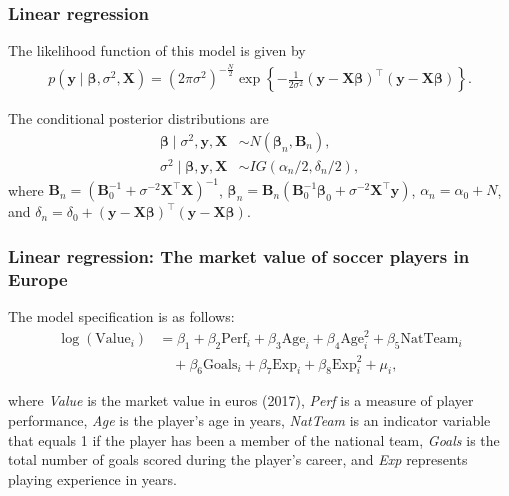 \documentclass[12pt, compress]{beamer}
\begin{document}
\begin{frame}
	\frametitle{Linear regression}
The likelihood function of this model is given by
\begin{align*}
	p({\bm{y}} \mid \bm{\beta}, \sigma^2, {\bm{X}}) 
	= (2\pi\sigma^2)^{-\frac{N}{2}} 
	\exp\left\{ -\frac{1}{2\sigma^2} ({\bm{y}} - {\bm{X}}\bm{\beta})^{\top} ({\bm{y}} - {\bm{X}}\bm{\beta}) \right\}.
\end{align*}

The conditional posterior distributions are
\begin{align*}
	\bm{\beta} \mid \sigma^2, {\bm{y}}, {\bm{X}} &\sim N(\bm{\beta}_n, {\bm{B}}_n), \\
	\sigma^2 \mid \bm{\beta}, {\bm{y}}, {\bm{X}} &\sim IG(\alpha_n/2, \delta_n/2),
\end{align*}
where 
${\bm{B}}_n = ({\bm{B}}_0^{-1} + \sigma^{-2} {\bm{X}}^{\top}{\bm{X}})^{-1}$, 
$\bm{\beta}_n = {\bm{B}}_n ({\bm{B}}_0^{-1}\bm{\beta}_0 + \sigma^{-2} {\bm{X}}^{\top}{\bm{y}})$, 
$\alpha_n = \alpha_0 + N$, and 
$\delta_n = \delta_0 + ({\bm{y}} - {\bm{X}}\bm{\beta})^{\top}({\bm{y}} - {\bm{X}}\bm{\beta})$.

\end{frame}

\begin{frame}
	\frametitle{Linear regression: The market value of soccer players in Europe}
The model specification is as follows:
\begin{align*}
	\log(\text{Value}_i) &= {\beta}_1 + {\beta}_2 \text{Perf}_i + {\beta}_3 \text{Age}_i + {\beta}_4 \text{Age}_i^2 + {\beta}_5 \text{NatTeam}_i \\
	&\quad + {\beta}_6 \text{Goals}_i + {\beta}_7 \text{Exp}_i + {\beta}_8 \text{Exp}_i^2 + \mu_i,
\end{align*}

where \textit{Value} is the market value in euros (2017), \textit{Perf} is a measure of player performance, \textit{Age} is the player's age in years, \textit{NatTeam} is an indicator variable that equals 1 if the player has been a member of the national team, \textit{Goals} is the total number of goals scored during the player's career, and \textit{Exp} represents playing experience in years.
\end{frame}
\end{document}

